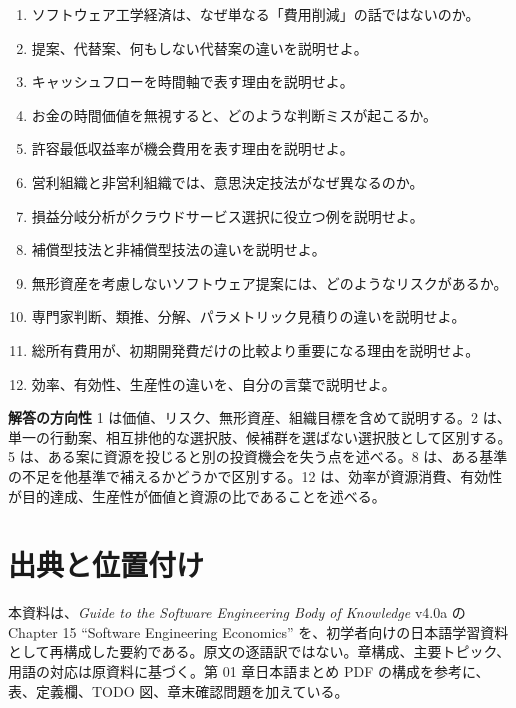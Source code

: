 \documentclass[a4paper,11pt]{article}
\begin{document}
\begin{enumerate}
  \item ソフトウェア工学経済は、なぜ単なる「費用削減」の話ではないのか。
  \item 提案、代替案、何もしない代替案の違いを説明せよ。
  \item キャッシュフローを時間軸で表す理由を説明せよ。
  \item お金の時間価値を無視すると、どのような判断ミスが起こるか。
  \item 許容最低収益率が機会費用を表す理由を説明せよ。
  \item 営利組織と非営利組織では、意思決定技法がなぜ異なるのか。
  \item 損益分岐分析がクラウドサービス選択に役立つ例を説明せよ。
  \item 補償型技法と非補償型技法の違いを説明せよ。
  \item 無形資産を考慮しないソフトウェア提案には、どのようなリスクがあるか。
  \item 専門家判断、類推、分解、パラメトリック見積りの違いを説明せよ。
  \item 総所有費用が、初期開発費だけの比較より重要になる理由を説明せよ。
  \item 効率、有効性、生産性の違いを、自分の言葉で説明せよ。
\end{enumerate}

\begin{importantbox}
\textbf{解答の方向性} 1 は価値、リスク、無形資産、組織目標を含めて説明する。2 は、単一の行動案、相互排他的な選択肢、候補群を選ばない選択肢として区別する。5 は、ある案に資源を投じると別の投資機会を失う点を述べる。8 は、ある基準の不足を他基準で補えるかどうかで区別する。12 は、効率が資源消費、有効性が目的達成、生産性が価値と資源の比であることを述べる。
\end{importantbox}

\section*{出典と位置付け}

本資料は、\textit{Guide to the Software Engineering Body of Knowledge} v4.0a の Chapter 15 ``Software Engineering Economics'' を、初学者向けの日本語学習資料として再構成した要約である。原文の逐語訳ではない。章構成、主要トピック、用語の対応は原資料に基づく。第 01 章日本語まとめ PDF の構成を参考に、表、定義欄、TODO 図、章末確認問題を加えている。
\end{document}
